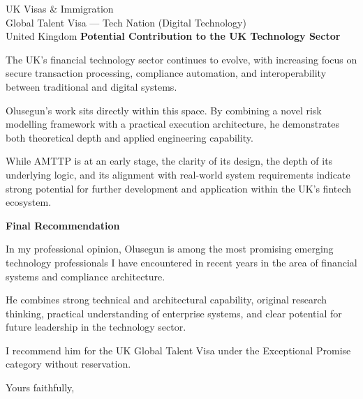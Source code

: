\documentclass[12pt,a4paper]{letter}
\begin{document}
\begin{letter}{UK Visas \& Immigration\\
Global Talent Visa --- Tech Nation (Digital Technology)\\
United Kingdom}
\textbf{Potential Contribution to the UK Technology Sector}

The UK’s financial technology sector continues to evolve, with increasing focus on secure transaction processing, compliance automation, and interoperability between traditional and digital systems.

Olusegun’s work sits directly within this space. By combining a novel risk modelling framework with a practical execution architecture, he demonstrates both theoretical depth and applied engineering capability.

While AMTTP is at an early stage, the clarity of its design, the depth of its underlying logic, and its alignment with real-world system requirements indicate strong potential for further development and application within the UK’s fintech ecosystem.

\textbf{Final Recommendation}

In my professional opinion, Olusegun is among the most promising emerging technology professionals I have encountered in recent years in the area of financial systems and compliance architecture.

He combines strong technical and architectural capability, original research thinking, practical understanding of enterprise systems, and clear potential for future leadership in the technology sector.

I recommend him for the UK Global Talent Visa under the Exceptional Promise category without reservation.

\closing{Yours faithfully,}

\end{letter}
\end{document}
